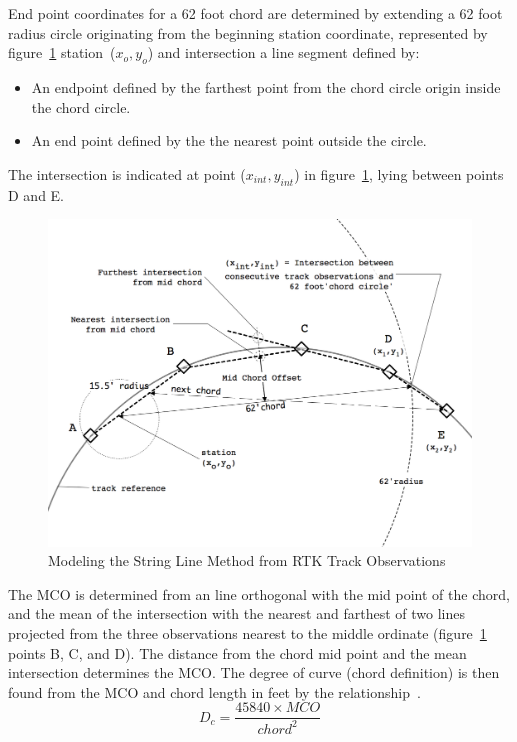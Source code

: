 End point coordinates for a 62 foot chord are determined by extending a 62 foot radius circle originating from the beginning station coordinate, represented by figure~\ref{fig:strLine} station~($x_o, y_o$) and intersection a line segment defined by:
\begin{itemize}
	\item An endpoint defined by the farthest point from the chord circle origin inside the chord circle.
	\item An end point defined by the the nearest point outside the circle.
\end{itemize}

The intersection is indicated at point ($x_{int}, y_{int}$) in figure~\ref{fig:strLine}, lying between points D and E.

\begin{figure}[!htp]
	\begin{center}
		\includegraphics[width=13cm]{graphics/stringLining.png}
		\caption{Modeling the String Line Method from RTK Track Observations}
		\label{fig:strLine}
	\end{center}
\end{figure}

The MCO is determined from an line orthogonal with the mid point of the chord, and the mean of the intersection with the nearest and farthest of two lines projected from the three observations nearest to the middle ordinate (figure~\ref{fig:strLine} points B, C, and D). The distance from the chord mid point and the mean intersection determines the MCO. The degree of curve (chord definition) is then found from the MCO and chord length in feet by the relationship~\citep{1964hickerson}.
	\begin{equation}
		D_c = \frac{45840 \times MCO}{chord^2}
		\label{eqn:degOcrv}
	\end{equation}
	
